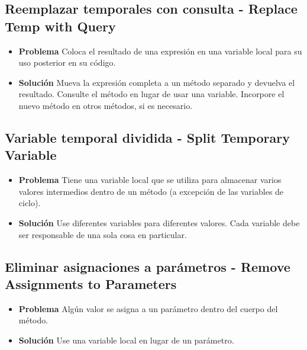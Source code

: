 \documentclass[11pt,a4paper,oneside]{book}
\begin{document}
\subsection{Reemplazar temporales con consulta - Replace Temp with Query}
\label{replacetempwithquery}
\begin{itemize}
    \item \textbf{Problema} Coloca el resultado de una expresión en una variable local para su uso posterior en su código.
    \item \textbf{Solución} Mueva la expresión completa a un método separado y devuelva el resultado. Consulte el método en lugar de usar una variable. Incorpore el nuevo método en otros métodos, si es necesario.
\end{itemize}


    
\subsection{Variable temporal dividida - Split Temporary Variable}
\label{splittemporaryvariable}
\begin{itemize}
    \item \textbf{Problema} Tiene una variable local que se utiliza para almacenar varios valores intermedios dentro de un método (a excepción de las variables de ciclo).
    \item \textbf{Solución} Use diferentes variables para diferentes valores. Cada variable debe ser responsable de una sola cosa en particular.
\end{itemize}



\subsection{Eliminar asignaciones a parámetros - Remove Assignments to Parameters}
\label{removeassignmentstoparameters}
\begin{itemize}
    \item \textbf{Problema} Algún valor se asigna a un parámetro dentro del cuerpo del método.
    \item \textbf{Solución} Use una variable local en lugar de un parámetro.
\end{itemize}


\end{document}
